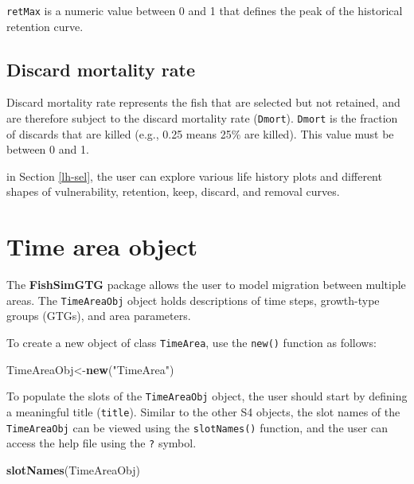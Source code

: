 \documentclass[
]{book}
\newenvironment{Shaded}{\begin{snugshade}}{\end{snugshade}}
\newcommand{\FunctionTok}[1]{\textcolor[rgb]{0.13,0.29,0.53}{\textbf{#1}}}
\newcommand{\NormalTok}[1]{#1}
\newcommand{\OtherTok}[1]{\textcolor[rgb]{0.56,0.35,0.01}{#1}}
\newcommand{\StringTok}[1]{\textcolor[rgb]{0.31,0.60,0.02}{#1}}
\begin{document}
\texttt{retMax} is a numeric value between 0 and 1 that defines the peak of the historical retention curve.

\subsection{Discard mortality rate}\label{discard-mortality-rate}

Discard mortality rate represents the fish that are selected but not retained, and are therefore subject to the discard mortality rate (\texttt{Dmort}). \texttt{Dmort} is the fraction of discards that are killed (e.g., 0.25 means 25\% are killed). This value must be between 0 and 1.

in Section \ref{lh-sel}, the user can explore various life history plots and different shapes of vulnerability, retention, keep, discard, and removal curves.

\section{Time area object}\label{time-area-object}

The \textbf{FishSimGTG} package allows the user to model migration between multiple areas. The \texttt{TimeAreaObj} object holds descriptions of time steps, growth-type groups (GTGs), and area parameters.

To create a new object of class \texttt{TimeArea}, use the \texttt{new()} function as follows:

\begin{Shaded}
\begin{Highlighting}[]
\NormalTok{TimeAreaObj}\OtherTok{\textless{}{-}}\FunctionTok{new}\NormalTok{(}\StringTok{"TimeArea"}\NormalTok{)}
\end{Highlighting}
\end{Shaded}

To populate the slots of the \texttt{TimeAreaObj} object, the user should start by defining a meaningful title (\texttt{title}). Similar to the other S4 objects, the slot names of the \texttt{TimeAreaObj} can be viewed using the \texttt{slotNames()} function, and the user can access the help file using the \texttt{?} symbol.

\begin{Shaded}
\begin{Highlighting}[]
\FunctionTok{slotNames}\NormalTok{(TimeAreaObj)}
\end{Highlighting}
\end{Shaded}
\end{document}
